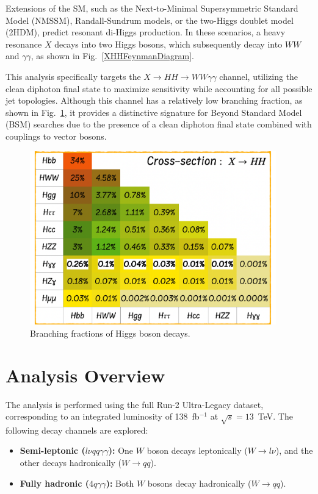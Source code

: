 Extensions of the SM, such as the Next-to-Minimal Supersymmetric Standard Model (NMSSM), Randall-Sundrum models, or the two-Higgs
doublet model (2HDM), predict resonant di-Higgs production. In these scenarios, a heavy resonance \(X\) decays into two Higgs
bosons, which subsequently decay into \(WW\) and \(\gamma\gamma\), as shown in Fig.~\ref{XHHFeynmanDiagram}.

This analysis specifically targets the \(X \to HH \to WW\gamma\gamma\) channel, utilizing the clean diphoton final state to maximize sensitivity while accounting for all possible jet topologies.
Although this channel has a relatively low branching fraction, as shown in Fig.~\ref{fig:HH_BF},
it provides a distinctive signature for Beyond Standard Model (BSM) searches due to
the presence of a clean diphoton final state combined with couplings to vector bosons.

\begin{figure}[!htbp]
    \centering
    \includegraphics[width=0.95\textwidth]{figures/diHiggsSearches/HH_BF.pdf}
    \caption{Branching fractions of Higgs boson decays.}
    \label{fig:HH_BF}
\end{figure}


\section{Analysis Overview}
The analysis is performed using the full Run-2 Ultra-Legacy dataset, corresponding to an integrated luminosity of 138~fb\(^{-1}\) at
\(\sqrt{s} = 13\)~TeV. The following decay channels are explored:
\begin{itemize}
    \item \textbf{Semi-leptonic (\(l\nu qq\gamma\gamma\)):} One \(W\) boson decays leptonically (\(W \to l\nu\)), and the other
    decays hadronically (\(W \to qq\)).
    \item \textbf{Fully hadronic (\(4q\gamma\gamma\)):} Both \(W\) bosons decay hadronically (\(W \to qq\)).
\end{itemize}

